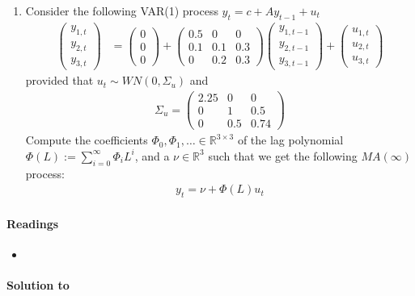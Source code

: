 \begin{enumerate}
\item Consider the following VAR(1) process \(y_t = c + A y_{t-1} + u_t\)
\begin{align*}
\begin{pmatrix}y_{1,t} \\ y_{2,t}\\y_{3,t} \end{pmatrix} &= \begin{pmatrix}0\\0\\0 \end{pmatrix} + \begin{pmatrix}0.5 &0 &0 \\0.1&0.1&0.3\\0&0.2&0.3 \end{pmatrix} \begin{pmatrix}y_{1,{t-1}} \\ y_{2,{t-1}}\\y_{3,{t-1}} \end{pmatrix} + \begin{pmatrix}u_{1,t} \\ u_{2,t}\\ u_{3,t} \end{pmatrix}
\end{align*}
provided that \(u_t \sim WN(0,\Sigma_u)\) and
\begin{align*}
	\Sigma_u = \begin{pmatrix}2.25 & 0 & 0\\ 0 & 1 & 0.5\\ 0 & 0.5 & 0.74 \end{pmatrix}
\end{align*}
Compute the coefficients \(\Phi_0, \Phi_1, \dots \in \mathbb{R}^{3\times 3}\) of the lag polynomial \(\Phi(L) := \sum_{i=0}^\infty \Phi_i L^i\),
and a \(\nu \in \mathbb{R}^3\) such that we get the following \(MA(\infty)\) process:
\begin{align*}
y_t = \nu + \Phi(L) u_t
\end{align*}

\end{enumerate}

\paragraph{Readings}
\begin{itemize}
	\item \textcite[Ch.~2]{Lutkepohl_2005_NewIntroductionMultiple}
\end{itemize}

\begin{solution}\textbf{Solution to }
\ifDisplaySolutions

\fi
\newpage
\end{solution}